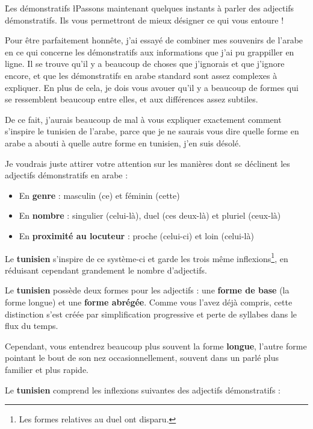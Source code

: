 \h{Les démonstratifs}
\l{P}assons maintenant quelques instants à parler des adjectifs démonstratifs. Ils vous permettront de mieux désigner ce qui vous entoure !

Pour être parfaitement honnête, j'ai essayé de combiner mes souvenirs de l'arabe en ce qui concerne les démonstratifs aux informations que j'ai pu grappiller en ligne. Il se trouve qu'il y a beaucoup de choses que j'ignorais et que j'ignore encore, et que les démonstratifs en arabe standard sont assez complexes à expliquer. En plus de cela, je dois vous avouer qu'il y a beaucoup de formes qui se ressemblent beaucoup entre elles, et aux différences assez subtiles.

De ce fait, j'aurais beaucoup de mal à vous expliquer exactement comment s'inspire le tunisien de l'arabe, parce que je ne saurais vous dire quelle forme en arabe a abouti à quelle autre forme en tunisien, j'en suis désolé. 

Je voudrais juste attirer votre attention sur les manières dont se déclinent les adjectifs démonstratifs en arabe : 

\begin{itemize}
    \item En \textbf{genre} : masculin (ce) et féminin (cette)
    \item En \textbf{nombre} : singulier (celui-là), duel (ces deux-là) et pluriel (ceux-là)
    \item En \textbf{proximité au locuteur} : proche (celui-ci) et loin (celui-là)
\end{itemize}

Le \textbf{tunisien} s'inspire de ce système-ci et garde les trois même inflexions\footnote{Les formes relatives au duel ont disparu.}, en réduisant cependant grandement le nombre d'adjectifs.

Le \textbf{tunisien} possède deux formes pour les adjectifs : une \textbf{forme de base} (la forme longue) et une \textbf{forme abrégée}. Comme vous l'avez déjà compris, cette distinction s'est créée par simplification progressive et perte de syllabes dans le flux du temps. 

Cependant, vous entendrez beaucoup plus souvent la forme \textbf{longue}, l'autre forme pointant le bout de son nez occasionnellement, souvent dans un parlé plus familier et plus rapide.

Le \textbf{tunisien} comprend les inflexions suivantes des adjectifs démonstratifs : 

